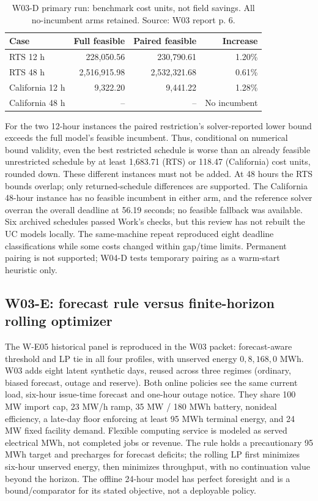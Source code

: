 \documentclass[11pt,letterpaper]{article}
\begin{document}
\begin{table}[htbp]\centering\small
\caption{W03-D primary run: benchmark cost units, not field savings. All no-incumbent arms retained. Source: W03 report p. 6.}\label{tab:w03uc}
\begin{tabular}{lrrr}\toprule
Case & Full feasible & Paired feasible & Increase\\\midrule
RTS 12 h &228,050.56&230,790.61&1.20\%\\
RTS 48 h &2,516,915.98&2,532,321.68&0.61\%\\
California 12 h &9,322.20&9,441.22&1.28\%\\
California 48 h &--&--&No incumbent\\\bottomrule\end{tabular}
\end{table}

For the two 12-hour instances the paired restriction's solver-reported lower bound exceeds the full model's feasible incumbent. Thus, conditional on numerical bound validity, even the best restricted schedule is worse than an already feasible unrestricted schedule by at least 1,683.71 (RTS) or 118.47 (California) cost units, rounded down. These different instances must not be added. At 48 hours the RTS bounds overlap; only returned-schedule differences are supported. The California 48-hour instance has no feasible incumbent in either arm, and the reference solver overran the overall deadline at 56.19 seconds; no feasible fallback was available. Six archived schedules passed Work's checks, but this review has not rebuilt the UC models locally. The same-machine repeat reproduced eight deadline classifications while some costs changed within gap/time limits. Permanent pairing is not supported; W04-D tests temporary pairing as a warm-start heuristic only.

\subsection{W03-E: forecast rule versus finite-horizon rolling optimizer}
The W-E05 historical panel is reproduced in the W03 packet: forecast-aware threshold and LP tie in all four profiles, with unserved energy $0,8,168,0$ MWh. W03 adds eight latent synthetic days, reused across three regimes (ordinary, biased forecast, outage and reserve). Both online policies see the same current load, six-hour issue-time forecast and one-hour outage notice. They share 100 MW import cap, 23 MW/h ramp, 35 MW / 180 MWh battery, nonideal efficiency, a late-day floor enforcing at least 95 MWh terminal energy, and 24 MW fixed facility demand. Flexible computing service is modeled as served electrical MWh, not completed jobs or revenue. The rule holds a precautionary 95 MWh target and precharges for forecast deficits; the rolling LP first minimizes six-hour unserved energy, then minimizes throughput, with no continuation value beyond the horizon. The offline 24-hour model has perfect foresight and is a bound/comparator for its stated objective, not a deployable policy.
\end{document}
